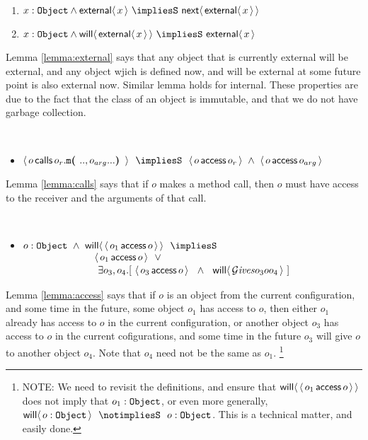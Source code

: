 \documentclass[acmsmall,screen,anonymous,review]{acmart}
\begin{document}
\begin{lemma}
\label{lemma:external}
~ ~ 

\begin{enumerate}
\item
$x:\prg{Object} \wedge \External {x} \ \impliesS \ \Next{\External{x}}$
\item
$x:\prg{Object} \wedge \Future{\External {x}} \ \impliesS \ {\External{x}}$
\end{enumerate}
\end{lemma}

Lemma \ref{lemma:external} says that any object that is currently external will be external, and any object wjich is defined now, and will be external at some future point is
also external now. Similar lemma holds for internal. These properties are due to the fact that the class of an object is immutable, and that we
do not have garbage collection.


\begin{lemma}
\label{lemma:calls}
~ ~ 

\begin{itemize}
\item
$\Calls {o} {\prg{m}}  {o_r}  {..,o_{arg}...} \ \ \impliesS  \ \ {\CanAccess {o} {o_r}} \ \wedge \  {\CanAccess {o} {o_{arg}} }  $
\end{itemize}
\end{lemma}

Lemma \ref{lemma:calls} says that if $o$ makes a method call, then $o$ must have access to the receiver and the arguments of that call.

\begin{lemma}
\label{lemma:access}
~ ~ 

\begin{itemize}
\item
$o:\prg{Object}\ \wedge\ {\Future {  \CanAccess {o_1} {o} }} \ \ \impliesS  $\\
$\strut \hspace{1in} \CanAccess {o_1} {o}\ \ 
\vee $\\
$\strut \hspace{1in}\ \exists o_3,o_4.[\ \CanAccess {o_3} {o}\ \ \wedge\ \ {\Future{\Gives {o_3} {o}{o_4}}} \ ]  $
\end{itemize}
\end{lemma}

Lemma \ref{lemma:access} says that if $o$ is an object from the current configuration,
 and some time in the future, some object $o_1$ has access to $o$,
then either $o_1$ already has access to $o$ in the current configuration, or  
another object  $o_3$ has access to $o$ in the current cofigurations, and 
 some time in the future $o_3$ will  give $o$ to another object $o_4$.
Note that $o_4$ need not be the same as $o_1$.
\footnote{NOTE: We need to revisit the definitions, and ensure that ${{\mathsf{will}}\langle \,  \langle\, o_1\, \mathsf{access}\, o\, \rangle \,\rangle}$ does not imply that
$o_1:{\mbox{\tt{Object}}}$, or even more generally,    ${\Future {  o:\prg{Object}}} \ \ \notimpliesS\ \ o:\prg{Object}$. This is a technical matter,
and easily done.}
\end{document}

